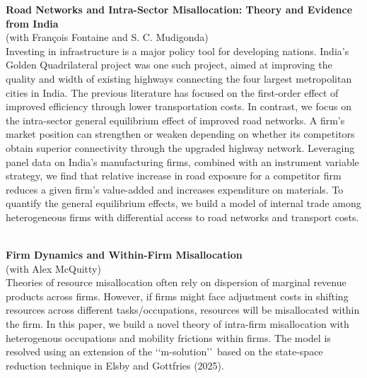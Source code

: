 \documentclass[11pt,a4paper]{article}
\begin{document}
\textbf{Road Networks and Intra-Sector Misallocation: Theory and Evidence from India}
\vspace{0.1cm}\\
(with François Fontaine and S. C. Mudigonda)
\vspace{0.1cm}\\
Investing in infrastructure is a major policy tool for developing nations. India's Golden Quadrilateral project was one such project, aimed at improving the quality and width of existing highways connecting the four largest metropolitan cities in India. The previous literature has focused on the first-order effect of improved efficiency through lower transportation costs. In contrast, we focus on the intra-sector general equilibrium effect of improved road networks. A firm’s market position can strengthen or weaken depending on whether its competitors obtain superior connectivity through the upgraded highway network. Leveraging panel data on India's manufacturing firms, combined with an instrument variable strategy, we find that relative increase in road exposure for a competitor firm reduces a given firm's value-added and increases expenditure on materials. To quantify the general equilibrium effects, we build a model of internal trade among heterogeneous firms with differential access to road networks and transport costs.

\vspace{0.6em}\\

\textbf{Firm Dynamics and Within-Firm Misallocation}
\vspace{0.1cm}\\
(with Alex McQuitty)
\vspace{0.1cm}\\
Theories of resource misallocation often rely on dispersion of marginal revenue products across firms. However, if firms might face adjustment costs in shifting resources across different tasks/occupations, resources will be misallocated within the firm. In this paper, we build a novel theory of intra-firm misallocation with heterogenous occupations and mobility frictions within firms. The model is resolved using an extension of the \lq\lq m-solution\rq\rq\ based on the state-space reduction technique in Elsby and Gottfries (2025). 

\vspace{-0.1cm}\\

\end{document}
